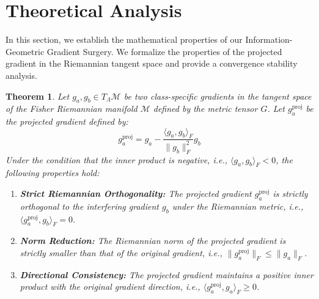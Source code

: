 \documentclass{article}
\theoremstyle{plain}
\newtheorem{theorem}{Theorem}[section]
\theoremstyle{definition}
\theoremstyle{remark}
\begin{document}
\section{Theoretical Analysis}
\label{sec:theory}
In this section, we establish the mathematical properties of our Information-Geometric Gradient Surgery. We formalize the properties of the projected gradient in the Riemannian tangent space and provide a convergence stability analysis.

\begin{theorem}
\label{thm:stability}
Let $g_a, g_b \in T_{\Lambda}\mathcal{M}$ be two class-specific gradients in the tangent space of the Fisher Riemannian manifold $\mathcal{M}$ defined by the metric tensor $G$. Let $g_a^{\text{proj}}$ be the projected gradient defined by:
\begin{equation}
g_a^{\text{proj}} = g_a - \frac{\langle g_a, g_b \rangle_F}{\|g_b\|_F^2} g_b
\end{equation}
Under the condition that the inner product is negative, i.e., $\langle g_a, g_b \rangle_F < 0$, the following properties hold:
\begin{enumerate}
    \item \textbf{Strict Riemannian Orthogonality:} The projected gradient $g_a^{\text{proj}}$ is strictly orthogonal to the interfering gradient $g_b$ under the Riemannian metric, i.e., $\langle g_a^{\text{proj}}, g_b \rangle_F = 0$.
    \item \textbf{Norm Reduction:} The Riemannian norm of the projected gradient is strictly smaller than that of the original gradient, i.e., $\|g_a^{\text{proj}}\|_F \leq \|g_a\|_F$.
    \item \textbf{Directional Consistency:} The projected gradient maintains a positive inner product with the original gradient direction, i.e., $\langle g_a^{\text{proj}}, g_a \rangle_F \geq 0$.
\end{enumerate}
\end{theorem}
\end{document}
